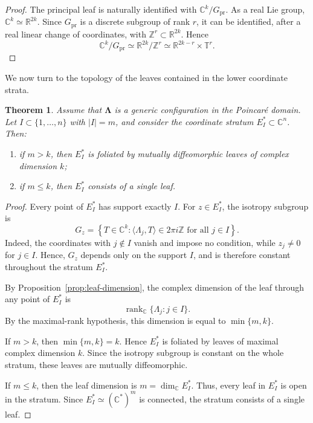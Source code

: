 \documentclass[11pt]{amsart}
\newtheorem{theorem}{Theorem}[section]
\theoremstyle{definition}
\theoremstyle{remark}
\newcommand{\Z}{\mathbb{Z}}
\newcommand{\C}{\mathbb{C}}
\newcommand{\R}{\mathbb{R}}
\newcommand{\T}{\mathbb{T}}
\newcommand{\Lam}{\pmb{\Lambda}}
\DeclareMathOperator{\rank}{rank}
\newcommand{\stratSS}[1]{E_{#1}^*}
\begin{document}
\begin{proof}
	The principal leaf is naturally identified with $\C^k/G_{\mathrm{pr}}$.
	As a real Lie group, $\C^k\simeq\R^{2k}$.
	Since $G_{\mathrm{pr}}$ is a discrete subgroup of rank $r$, it can be identified, after a real linear change of coordinates, with $\Z^r\subset\R^{2k}$.
	Hence
	\[
		\C^k/G_{\mathrm{pr}} \simeq \R^{2k}/\Z^r \simeq \R^{2k-r}\times\T^r.
	\]
\end{proof}

We now turn to the topology of the leaves contained in the lower coordinate strata.

\begin{theorem}\label{thm:coordinate-strata}
	Assume that $\Lam$ is a generic configuration in the Poincaré domain.
	Let $I\subset\{1,\dots,n\}$ with $|I|=m$, and consider the coordinate stratum $\stratSS{I}\subset\C^n$.
	Then:
	\begin{enumerate}
		\item if $m>k$, then $\stratSS{I}$ is foliated by mutually diffeomorphic
		      leaves of complex dimension $k$;
		\item if $m\le k$, then $\stratSS{I}$ consists of a single leaf.
	\end{enumerate}
\end{theorem}

\begin{proof}
	Every point of $\stratSS{I}$ has support exactly $I$.
	For $z\in\stratSS{I}$, the isotropy subgroup is
	\[
		G_z= \left\{ T\in\C^k: \langle\Lambda_j,T\rangle\in 2\pi i\Z \text{ for all } j\in I \right\}.
	\]
	Indeed, the coordinates with $j\notin I$ vanish and impose no condition,
	while $z_j\neq0$ for $j\in I$.
	Hence, $G_z$ depends only on the support $I$, and is therefore constant throughout the stratum $\stratSS{I}$.

	By Proposition~\ref{prop:leaf-dimension}, the complex dimension of the leaf through any point of $\stratSS{I}$ is
	\[
		\rank_{\C}\{\Lambda_j:j\in I\}.
	\]
	By the maximal-rank hypothesis, this dimension is equal to
	$\min\{m,k\}$.

	If $m>k$, then $\min\{m,k\}=k$.
	Hence $\stratSS{I}$ is foliated by leaves of maximal complex dimension $k$.
	Since the isotropy subgroup is constant on the whole stratum, these leaves are mutually diffeomorphic.

	If $m\le k$, then the leaf dimension is $m=\dim_\C \stratSS{I}$.
	Thus, every leaf in $\stratSS{I}$ is open in the stratum.
	Since $\stratSS{I}\simeq(\C^*)^m$ is connected, the stratum consists of a single leaf.
\end{proof}
\end{document}
